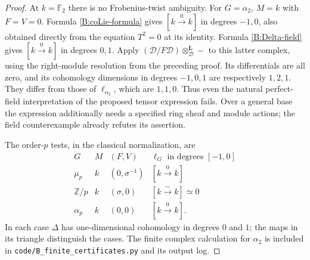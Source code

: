\begin{proof}
At $k=\mathbb F_2$ there is no Frobenius-twist ambiguity.
For $G=\alpha_2$, $M=k$ with $F=V=0$. Formula
\eqref{B:coLie-formula} gives $[k\xrightarrow0 k]$ in degrees
$-1,0$, also obtained directly from the equation $T^2=0$ at its
identity. Formula \eqref{B:Delta-field} gives
$[k\xrightarrow0 k]$ in degrees $0,1$.
Apply $(\mathcal D/F\mathcal D)\otimes^{\mathbf L}_{\mathcal D}-$
to this latter complex, using the right-module resolution from
the preceding proof. Its differentials are all zero, and its
cohomology dimensions in degrees $-1,0,1$ are respectively
$1,2,1$. They differ from those of $\ell_{\alpha_2}$, which are
$1,1,0$. Thus even the natural perfect-field interpretation of
the proposed tensor expression fails. Over a general base the
expression additionally needs a specified ring sheaf and module
actions; the field counterexample already refutes its assertion.

The order-$p$ tests, in the classical normalization, are
\[
\begin{array}{c|c|c|c}
G&M&(F,V)&\ell_G\text{ in degrees }[-1,0]\\\hline
\mu_p&k&(0,\sigma^{-1})&[k\xrightarrow0 k]\\
\mathbb Z/p&k&(\sigma,0)&[k\xrightarrow{\sim}k]\simeq0\\
\alpha_p&k&(0,0)&[k\xrightarrow0 k].
\end{array}
\]
In each case $\Delta$ has one-dimensional cohomology in degrees
$0$ and $1$; the maps in its triangle distinguish the cases.
The finite complex calculation for $\alpha_2$ is included in
\texttt{code/B\_finite\_certificates.py} and its output log.
\end{proof}
